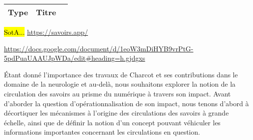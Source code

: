 \label{sect:sota}
\begin{table}[h]
	\centering
	\begin{tabularx}{\textwidth}{|>{\centering\arraybackslash}p{3.5cm}|>{\centering\arraybackslash}X|>{\centering\arraybackslash}X|}
		\hline
		Type & Titre &  \\
		\hline
	\end{tabularx}
\end{table}

\hl{SotA...}
\url{https://savoirs.app/}

\url{https://docs.google.com/document/d/1eoW3mDiHYB9vrPtG-5pdPuaUAAUJpWDa/edit\#heading=h.gjdgxs}


Étant donné l'importance des travaux de Charcot et ses contributions dans le domaine de la neurologie et au-delà, nous souhaitons explorer la notion de la circulation des savoirs au prisme du numérique à travers son impact. Avant d'aborder la question d'opérationnalisation de son impact, nous tenons d'abord à décortiquer les mécanismes à l'origine des circulations des savoirs à grande échelle, ainsi que de définir la notion d'un \og{}concept\fg{} pouvant véhiculer les informations importantes concernant les circulations en question. 








